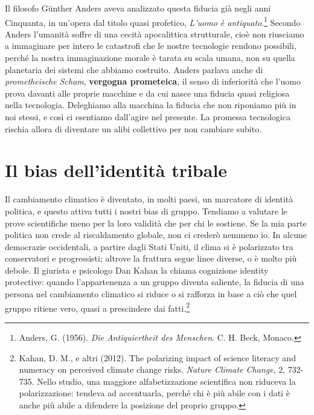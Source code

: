 Il filosofo Günther Anders aveva analizzato questa fiducia gi\`{a} negli anni Cinquanta, in un'opera dal titolo quasi profetico, \textit{L'uomo \`{e} antiquato}.\footnote{Anders, G. (1956). \textit{Die Antiquiertheit des Menschen}. C. H. Beck, Monaco.} Secondo Anders l'umanit\`{a} soffre di una cecit\`{a} apocalittica strutturale, cio\`{e} non riusciamo a immaginare per intero le catastrofi che le nostre tecnologie rendono possibili, perch\'{e} la nostra immaginazione morale \`{e} tarata su scala umana, non su quella planetaria dei sistemi che abbiamo costruito. Anders parlava anche di \textit{prometheische Scham}, \textbf{vergogna prometeica}, il senso di inferiorit\`{a} che l'uomo prova davanti alle proprie macchine e da cui nasce una fiducia quasi religiosa nella tecnologia. Deleghiamo alla macchina la fiducia che non riponiamo pi\`{u} in noi stessi, e cos\`{i} ci esentiamo dall'agire nel presente. La promessa tecnologica rischia allora di diventare un alibi collettivo per non cambiare subito.

\section{Il bias dell'identit\`{a} tribale}

Il cambiamento climatico \`{e} diventato, in molti paesi, un marcatore di identit\`{a} politica, e questo attiva tutti i nostri bias di gruppo. Tendiamo a valutare le prove scientifiche meno per la loro validit\`{a} che per chi le sostiene. Se la mia parte politica non crede al riscaldamento globale, non ci creder\`{o} nemmeno io. In alcune democrazie occidentali, a partire dagli Stati Uniti, il clima si \`{e} polarizzato tra conservatori e progressisti; altrove la frattura segue linee diverse, o è molto più debole. Il giurista e psicologo Dan Kahan la chiama cognizione identity protective: quando l'appartenenza a un gruppo diventa saliente, la fiducia di una persona nel cambiamento climatico si riduce o si rafforza in base a ci\`{o} che quel gruppo ritiene vero, quasi a prescindere dai fatti.\footnote{Kahan, D. M., e altri (2012). The polarizing impact of science literacy and numeracy on perceived climate change risks. \textit{Nature Climate Change}, 2, 732-735. Nello studio, una maggiore alfabetizzazione scientifica non riduceva la polarizzazione: tendeva ad accentuarla, perché chi è più abile con i dati è anche più abile a difendere la posizione del proprio gruppo.}

